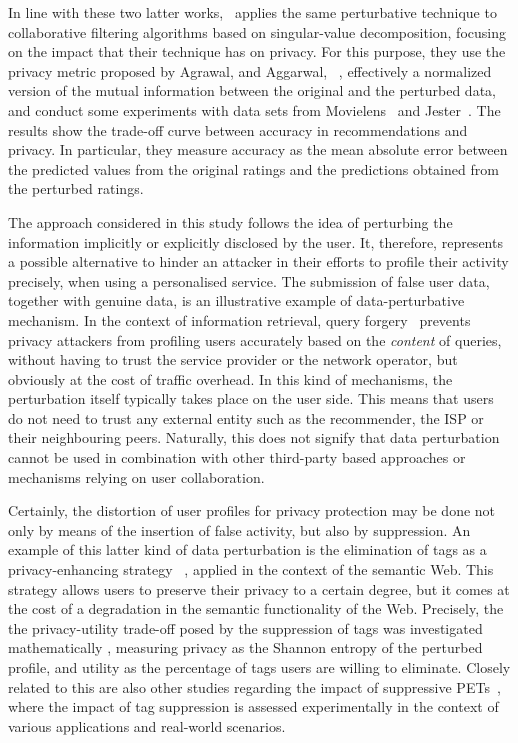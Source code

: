 In line with these two latter works, \cite{Polat05SAC}~applies the same perturbative technique to collaborative filtering algorithms based on singular-value decomposition, focusing on the impact that their technique has on privacy. For this purpose, they use the privacy metric proposed by Agrawal, and Aggarwal, ~\cite{Agrawal01SIGMOD}, effectively a normalized version of the mutual information between the original and the perturbed data, and conduct some experiments with data sets from Movielens~\cite{Movielens} and Jester~\cite{Jester}. The results show the trade-off curve between accuracy in recommendations and privacy. In particular, they measure accuracy as the mean
absolute error between the predicted values from the original ratings and the predictions obtained from the perturbed ratings.

The approach considered in this study follows the idea of perturbing the information implicitly or explicitly disclosed by the user. It, therefore, represents a possible alternative to hinder an attacker in their efforts to profile their activity precisely, when using a personalised service. The submission of false user data, together with genuine data, is an illustrative example of data-perturbative mechanism. In the context of information retrieval, query forgery~\cite{Rebollo10IT, parra2014optimal, rebollo2010optimized, parra2012privacy} prevents privacy attackers from profiling users accurately based on the \emph{content} of queries, without having to trust the service provider or the network operator, but obviously at the cost of traffic overhead. In this kind of mechanisms, the perturbation itself typically takes place on the user side. This means that users do not need to trust any external entity such as the recommender, the ISP or their neighbouring peers. Naturally, this does not signify that data perturbation cannot be used in combination with other third-party based approaches or mechanisms relying on user collaboration.

Certainly, the distortion of user profiles for privacy protection may be done not only by means of the insertion of false activity, but also by suppression. An example of this latter kind of data perturbation is the elimination of tags as a privacy-enhancing strategy ~\cite{Parra10TB, rebollo2012query, parra2012optimal, Parra13KDE}, applied in the context of the semantic Web. This strategy allows users to preserve their privacy to a certain degree, but it comes at the cost of a degradation in the semantic functionality of the Web. Precisely, the the privacy-utility trade-off posed by the suppression of tags was investigated mathematically  \cite{Parra12DKE, parra2014measuring, puglisi2015content}, measuring privacy as the Shannon entropy of the perturbed profile, and utility as the percentage of tags users are willing to eliminate. Closely related to this are also other studies regarding the impact of suppressive PETs~\cite{Parra12TKDE, puglisi2015content, parra2016shall}, where the impact of tag suppression is assessed experimentally in the context of various applications and real-world scenarios.

